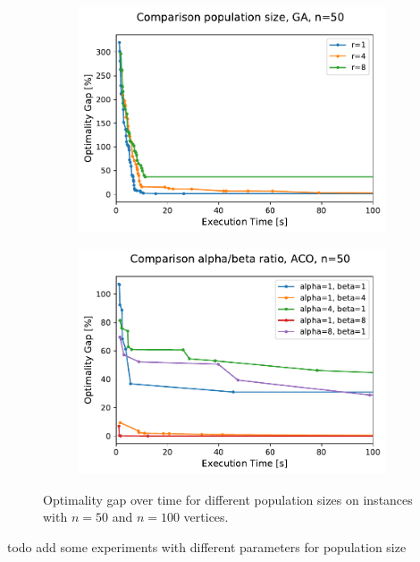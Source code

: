 \documentclass[12pt]{article}
\begin{document}
 \begin{figure}
        \centering
        \begin{subfigure}[b]{0.475\textwidth}
            \centering
            \includegraphics[width=\textwidth]{figures/ga_50_mutation_rate_comparison.pdf}
            \caption%
            {{\small }}    
            \label{fig:mean and std of net14}
        \end{subfigure}
        \hfill
        \begin{subfigure}[b]{0.475\textwidth}  
            \centering 
            \includegraphics[width=\textwidth]{figures/aco_50_alpha_beta_ratio_comparison.pdf}
            \caption%
            {{\small }}     
            \label{fig:mean and std of net24}
        \end{subfigure}
        \caption
        {\small Optimality gap over time for different population sizes on instances with $n=50$ and $n=100$ vertices. } 
        \label{fig:mean and std of nets}
    \end{figure}


todo add some experiments with different parameters for population size




\end{document}
